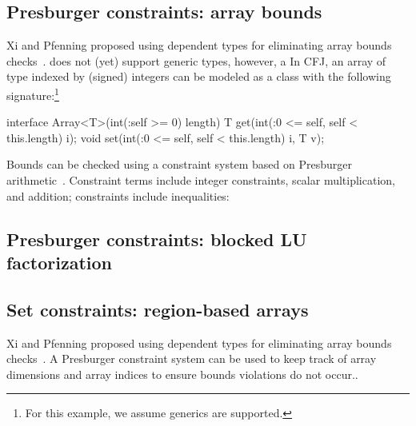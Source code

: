 \subsection{Presburger constraints: array bounds}

Xi and Pfenning proposed using dependent types for eliminating
array bounds checks~\cite{xi98array}.
\Xten{} does not (yet) support generic types, however, a 
In CFJ, an array of type  indexed by (signed) integers
can be modeled as a class with the following
signature:\footnote{For this example, we assume generics
are supported.}
\begin{displayxten}
interface Array<T>(int(:self >= 0) length) {
  T get(int(:0 <= self, self < this.length) i);
  void set(int(:0 <= self, self < this.length) i, T v);
}
\end{displayxten}

Bounds can be checked using a constraint system based on
Presburger arithmetic~\cite{omega}.  Constraint terms include
integer constraints, scalar multiplication, and addition;
constraints include inequalities:
\fi




\subsection{Presburger constraints: blocked LU factorization}

\subsection{Set constraints: region-based arrays}

Xi and Pfenning proposed using dependent types for eliminating
array bounds checks~\cite{xi98array}.  A Presburger constraint
system can be used to keep track of array dimensions and array
indices to ensure bounds violations do not occur..

